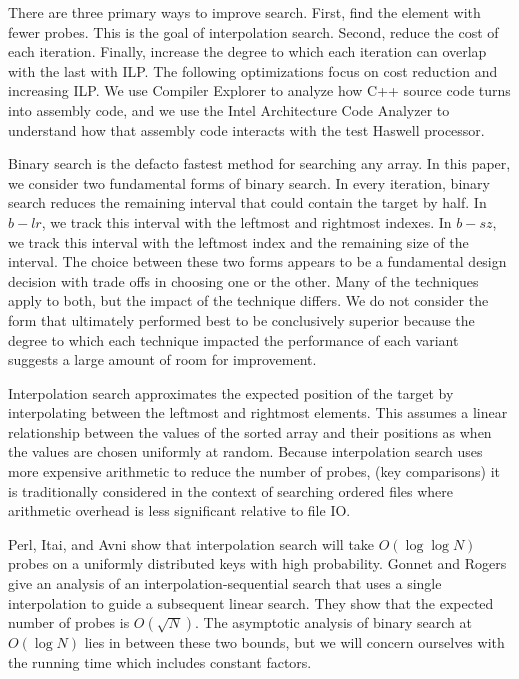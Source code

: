 \documentclass[twocolumn]{article}
\begin{document}
There are three primary ways to improve search. First, find the element with fewer probes. This is the goal of interpolation search. Second, reduce the cost of each iteration. Finally, increase the degree to which each iteration can overlap with the last with ILP. The following optimizations focus on cost reduction and increasing ILP. We use Compiler Explorer to analyze how C++ source code turns into assembly code, and we use the Intel Architecture Code Analyzer to understand how that assembly code interacts with the test Haswell processor.


Binary search is the defacto fastest method for searching any array. In this paper, we consider two fundamental forms of binary search. In every iteration, binary search reduces the remaining interval that could contain the target by half. In $b-lr$, we track this interval with the leftmost and rightmost indexes. In $b-sz$, we track this interval with the leftmost index and the remaining size of the interval. The choice between these two forms appears to be a fundamental design decision with trade offs in choosing one or the other. Many of the techniques apply to both, but the impact of the technique differs. We do not consider the form that ultimately performed best to be conclusively superior because the degree to which each technique impacted the performance of each variant suggests a large amount of room for improvement.

Interpolation search approximates the expected position of the target by interpolating between the leftmost and rightmost elements. This assumes a linear relationship between the values of the sorted array and their positions as when the values are chosen uniformly at random. Because interpolation search uses more expensive arithmetic to reduce the number of probes, (key comparisons) it is traditionally considered in the context of searching ordered files where arithmetic overhead is less significant relative to file IO.

Perl, Itai, and Avni \cite{perl-itai-avni} show that interpolation search will take $O(\log \log N)$ probes on a uniformly distributed keys with high probability. Gonnet and Rogers \cite{gonnet-rogers} give an analysis of an interpolation-sequential search that uses a single interpolation to guide a subsequent linear search. They show that the expected number of probes is $O(\sqrt N)$. The asymptotic analysis of binary search at $O(\log N)$ lies in between these two bounds, but we will concern ourselves with the running time which includes constant factors.
\end{document}
